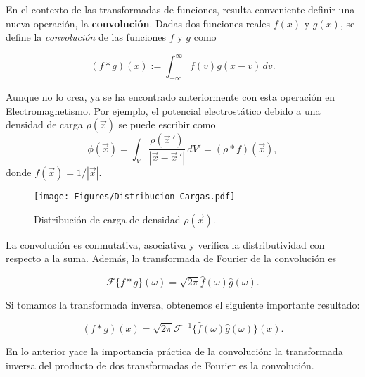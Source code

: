 En el contexto de las transformadas de funciones, resulta conveniente definir una nueva operación, la \textbf{convolución}. Dadas dos funciones reales $f(x)$ y $g(x)$, se define la  \textit{convolución} de las funciones $f$ y $g$ como 
\begin{shaded}
\begin{equation}
 (f*g)(x) := \int_{-\infty}^{\infty} f(v) g(x-v) \,dv.   \label{eq:Convolucion}
\end{equation}    
\end{shaded}

Aunque no lo crea, ya se ha encontrado anteriormente con esta operación en Electromagnetismo. Por ejemplo, el potencial electrostático debido a una densidad de carga $\rho(\Vec{x})$ se puede escribir como
\begin{equation}
\phi(\Vec{x}) = \int_{V} \frac{\rho(\Vec{x}\,')}{|\Vec{x} - \Vec{x}\,'|} \, dV' = (\rho * f)(\Vec{x}),    
\end{equation}
donde  $f(\Vec{x}) = 1/|\Vec{x}|$.

\begin{figure}[H]
    \centering
    \texttt{[image: Figures/Distribucion-Cargas.pdf]}
    \caption{Distribución de carga de densidad $\rho(\Vec{x})$.}
    \label{fig:PotencialDistribucion}
\end{figure}

La convolución es conmutativa, asociativa y verifica la distributividad con respecto a la suma. Además, la transformada de Fourier de la convolución es
\begin{shaded}
    \begin{equation}
        \mathcal{F}\{f*g\}(\omega) = \sqrt{2\pi} \hat{f}(\omega) \hat{g}(\omega). \label{eq:convolution-teo-1}
    \end{equation}
\end{shaded}

Si tomamos la transformada inversa, obtenemos el siguiente importante resultado:
\begin{shaded}
    \begin{equation}
        (f*g)(x) = \sqrt{2\pi} \mathcal{F}^{-1}\{\hat{f}(\omega) \hat{g}(\omega)\}(x). \label{eq:convolution-teo-2}
    \end{equation}
\end{shaded}

En lo anterior yace la importancia práctica de la convolución: la transformada inversa del producto de dos transformadas de Fourier es la convolución.

